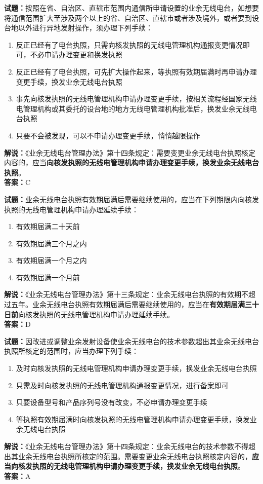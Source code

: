\documentclass{ctexbook}
\begin{document}
\noindent\textbf{试题：}按照在省、自治区、直辖市范围内通信所申请设置的业余无线电台，如想要将通信范围扩大至涉及两个以上的省、自治区、直辖市或者涉及境外，或者要到设台地以外进行异地发射操作，须办理下列手续：
\begin{enumerate}[leftmargin=3em]
  \item 反正已经有了电台执照，只需向核发执照的无线电管理机构通报变更情况即可，不必申请办理变更和换发执照
  \item 反正已经有了电台执照，可先扩大操作起来，等执照有效期届满时再申请办理变更手续，换发业余无线电台执照
  \item 事先向核发执照的无线电管理机构申请办理变更手续，按相关流程经国家无线电管理机构或其委托的设台地的地方无线电管理机构批准后，换发业余无线电台执照
  \item 只要不会被发现，可以不申请办理变更手续，悄悄越限操作
\end{enumerate}
\noindent\textbf{解说：}《业余无线电台管理办法》第十四条规定：需要变更业余无线电台执照核定内容的，应当\textbf{向核发执照的无线电管理机构申请办理变更手续，换发业余无线电台执照}。\\\noindent\textbf{答案：}C

\bigskip

\noindent\textbf{试题：}业余无线电台执照有效期届满后需要继续使用的，应当在下列期限内向核发执照的无线电管理机构申请办理延续手续：
\begin{enumerate}[leftmargin=3em]
  \item 有效期届满二十天前
  \item 有效期届满三个月之内
  \item 有效期届满一个月之内
  \item 有效期届满一个月前
\end{enumerate}
\noindent\textbf{解说：}《业余无线电台管理办法》第十三条规定：业余无线电台执照的有效期不超过五年。业余无线电台执照有效期届满后需要继续使用的，应当在\textbf{有效期届满三十日前}向核发执照的无线电管理机构申请办理延续手续。\\\noindent\textbf{答案：}D

\bigskip

\noindent\textbf{试题：}因改进或调整业余发射设备使业余无线电台的技术参数超出其业余无线电台执照所核定的范围时，应当办理下列手续：
\begin{enumerate}[leftmargin=3em]
  \item 及时向核发执照的无线电管理机构申请办理变更手续，换发业余无线电台执照
  \item 只需及时向核发执照的无线电管理机构通报变更情况，进行备案即可
  \item 只要设备型号和产品序列号没有改变，不必申请办理变更手续
  \item 等执照有效期届满时向核发执照的无线电管理机构申请办理变更手续，换发业余无线电台执照
\end{enumerate}
\noindent\textbf{解说：}《业余无线电台管理办法》第十四条规定：业余无线电台的技术参数不得超出其业余无线电台执照所核定的范围。需要变更业余无线电台执照核定内容的，\textbf{应当向核发执照的无线电管理机构申请办理变更手续，换发业余无线电台执照}。\\\noindent\textbf{答案：}A
\end{document}
